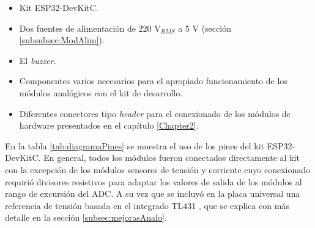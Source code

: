\begin{itemize}
\item Kit ESP32-DevKitC.
\item Dos fuentes de alimentación de 220 V$_{RMS}$ a 5 V (sección \ref{subsubsec:ModAlim}).
\item El \textit{buzzer}. 
\item Componentes varios necesarios para el apropiado funcionamiento de los módulos analógicos con el kit de desarrollo.
\item Diferentes conectores tipo \textit{header} para el conexionado de los módulos de hardware presentados en el capítulo \ref{Chapter2}.
\end{itemize}

En la tabla \ref{tab:diagramaPines} se muestra el uso de los pines del kit ESP32-DevKitC. En general, todos los módulos fueron conectados directamente al kit con la excepción de los módulos sensores de tensión y corriente cuyo conexionado requirió divisores resistivos para adaptar los valores de salida de los módulos al rango de excursión del ADC. A su vez que se incluyó en la placa universal una referencia de tensión basada en el integrado TL431 \citep{TL431}, que se explica con más detalle en la sección \ref{subsec:mejorasAnalo}.

